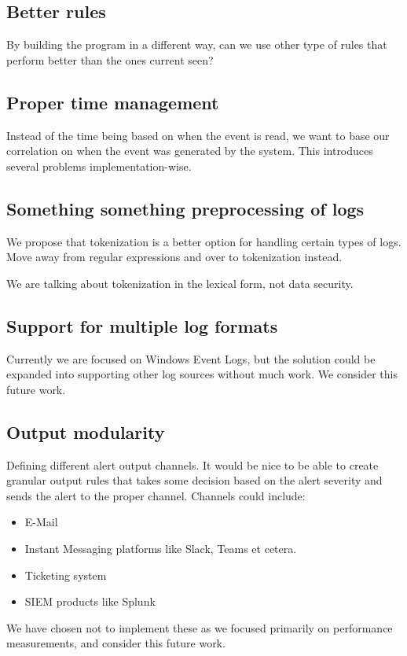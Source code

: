 \subsection{Better rules}
\label{sub:better-rules}

By building the program in a different way, can we use other type of rules that perform better than the ones current seen?

\subsection{Proper time management}
\label{sub:time-management}

Instead of the time being based on when the event is read, we want to base our correlation on when the event was generated by the system. This introduces several problems implementation-wise.

\subsection{Something something preprocessing of logs}

We propose that tokenization is a better option for handling certain types of logs. Move away from regular expressions and over to tokenization instead.

We are talking about tokenization in the lexical form, not data security.

\subsection{Support for multiple log formats}
\label{sub:multiple-log-formats}

Currently we are focused on Windows Event Logs, but the solution could be expanded into supporting other log sources without much work. We consider this future work.

\subsection{Output modularity}
\label{sub:modularity}

Defining different alert output channels. It would be nice to be able to create granular output rules that takes some decision based on the alert severity and sends the alert to the proper channel. Channels could include:

\begin{itemize}
    \item E-Mail
    \item Instant Messaging platforms like Slack, Teams et cetera.
    \item Ticketing system
    \item SIEM products like Splunk
\end{itemize}
We have chosen not to implement these as we focused primarily on performance measurements, and consider this future work.

